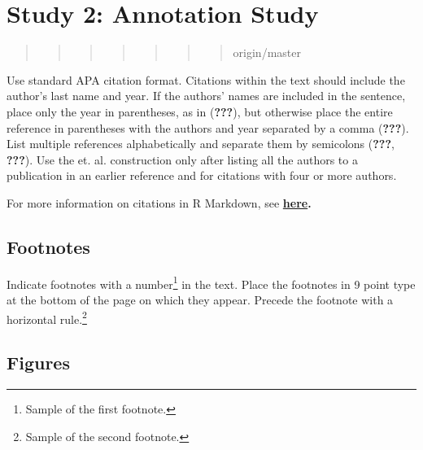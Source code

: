 \documentclass[10pt, letterpaper]{article}
\begin{document}
\section{Study 2: Annotation Study}\label{study-2-annotation-study}

\begin{quote}
\begin{quote}
\begin{quote}
\begin{quote}
\begin{quote}
\begin{quote}
\begin{quote}
origin/master
\end{quote}
\end{quote}
\end{quote}
\end{quote}
\end{quote}
\end{quote}
\end{quote}

Use standard APA citation format. Citations within the text should
include the author's last name and year. If the authors' names are
included in the sentence, place only the year in parentheses, as in
({\textbf{???}}), but otherwise place the entire reference in
parentheses with the authors and year separated by a comma
({\textbf{???}}). List multiple references alphabetically and separate
them by semicolons ({\textbf{???}}, {\textbf{???}}). Use the et. al.
construction only after listing all the authors to a publication in an
earlier reference and for citations with four or more authors.

For more information on citations in R Markdown, see
\textbf{\href{http://rmarkdown.rstudio.com/authoring_bibliographies_and_citations.html\#citations}{here}.}

\subsection{Footnotes}\label{footnotes}

Indicate footnotes with a number\footnote{Sample of the first
footnote.} in the text. Place the footnotes in 9 point type at the
bottom of the page on which they appear. Precede the footnote with a
horizontal rule.\footnote{Sample of the second footnote.}

\subsection{Figures}\label{figures}
\end{document}
